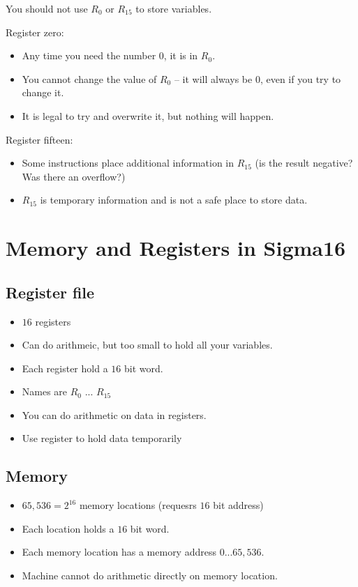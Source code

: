You should not use \(R_0\) or \(R_{15}\) to store variables.

Register zero:
\begin{itemize}
	\item Any time you need the number \(0\), it is in \(R_0\).
	\item You cannot change the value of \(R_0\) -- it will always  be \(0\), even if you try to change it.
	\item It is legal to try and overwrite it, but nothing will happen.
\end{itemize}
%
Register fifteen:
\begin{itemize}
	\item Some instructions place additional information in \(R_{15}\) (is the result negative? Was there an overflow?)
	\item \(R_{15}\) is temporary information and is not a safe place to store data.
\end{itemize}

\section{Memory and Registers in Sigma16}\label{sec:memory_and_registers_in_sigma16}

\subsection{Register file}\label{sub:register_file_one}

\begin{itemize}
	\item \(16\) registers
	\item Can do arithmeic, but too small to hold all your variables.
	\item Each register hold a \(16\) bit word.
	\item Names are \(R_0\) ...  \(R_{15}\)
	\item You can do arithmetic on data in registers.
	\item Use register to hold data temporarily
\end{itemize}

\subsection{Memory}\label{sub:memory}

\begin{itemize}
	\item \(65,536 = 2^{16}\) memory locations (requesrs \(16\) bit address)
	\item Each location holds a \(16\) bit word.
	\item Each memory location has a memory address \(0\)...\(65,536\).
	\item Machine cannot do arithmetic directly on memory location.
\end{itemize}


